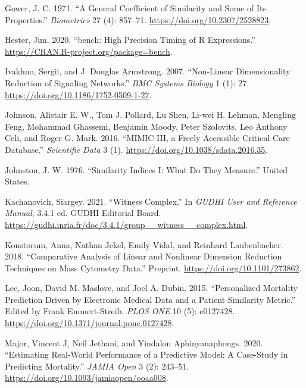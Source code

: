 \documentclass{article}
\newlength{\cslhangindent}
\newlength{\cslentryspacingunit} %
\newenvironment{CSLReferences}[2] %
 {%
  \setlength{\parindent}{0pt}
  \ifodd #1
  \let\oldpar\par
  \def\par{\hangindent=\cslhangindent\oldpar}
  \fi
  \setlength{\parskip}{#2\cslentryspacingunit}
 }%
 {}
\begin{document}
\begin{CSLReferences}{1}{0}
\leavevmode{}%
Gower, J. C. 1971. {``A {General Coefficient} of {Similarity} and {Some}
of {Its Properties}.''} \emph{Biometrics} 27 (4): 857--71.
\url{https://doi.org/10.2307/2528823}.

\leavevmode{}%
Hester, Jim. 2020. {``{bench}: {High Precision Timing} of {R
Expressions}.''} \url{https://CRAN.R-project.org/package=bench}.

\leavevmode{}%
Ivakhno, Sergii, and J. Douglas Armstrong. 2007. {``Non-Linear
Dimensionality Reduction of Signaling Networks.''} \emph{BMC Systems
Biology} 1 (1): 27. \url{https://doi.org/10.1186/1752-0509-1-27}.

\leavevmode{}%
Johnson, Alistair E. W., Tom J. Pollard, Lu Shen, Li-wei H. Lehman,
Mengling Feng, Mohammad Ghassemi, Benjamin Moody, Peter Szolovits, Leo
Anthony Celi, and Roger G. Mark. 2016. {``{MIMIC-III}, a Freely
Accessible Critical Care Database.''} \emph{Scientific Data} 3 (1).
\url{https://doi.org/10.1038/sdata.2016.35}.

\leavevmode{}%
Johnston, J. W. 1976. {``Similarity Indices {I}: What Do They
Measure.''} {United States}.

\leavevmode{}%
Kachanovich, Siargey. 2021. {``Witness Complex.''} In \emph{{GUDHI User}
and {Reference Manual}}, 3.4.1 ed. {GUDHI Editorial Board}.
\url{https://gudhi.inria.fr/doc/3.4.1/group__witness__complex.html}.

\leavevmode{}%
Konstorum, Anna, Nathan Jekel, Emily Vidal, and Reinhard Laubenbacher.
2018. {``Comparative {Analysis} of {Linear} and {Nonlinear Dimension
Reduction Techniques} on {Mass Cytometry Data}.''} Preprint.
\url{https://doi.org/10.1101/273862}.

\leavevmode{}%
Lee, Joon, David M. Maslove, and Joel A. Dubin. 2015. {``Personalized
{Mortality Prediction Driven} by {Electronic Medical Data} and a
{Patient Similarity Metric}.''} Edited by Frank Emmert-Streib.
\emph{PLOS ONE} 10 (5): e0127428.
\url{https://doi.org/10.1371/journal.pone.0127428}.

\leavevmode{}%
Major, Vincent J, Neil Jethani, and Yindalon Aphinyanaphongs. 2020.
{``Estimating Real-World Performance of a Predictive Model: A Case-Study
in Predicting Mortality.''} \emph{JAMIA Open} 3 (2): 243--51.
\url{https://doi.org/10.1093/jamiaopen/ooaa008}.


\end{CSLReferences}
\end{document}

